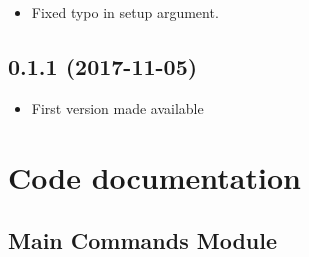 \documentclass[letterpaper,10pt,english]{sphinxmanual}
\begin{document}
\begin{itemize}
\item {} 
Fixed typo in setup  argument.

\end{itemize}


\section{0.1.1 (2017-11-05)}
\label{\detokenize{index:id7}}\begin{itemize}
\item {} 
First version made available

\end{itemize}


\chapter{Code documentation}
\label{\detokenize{index:code-documentation}}

\section{Main Commands Module}
\label{\detokenize{index:module-fsbackup.commands}}\label{\detokenize{index:main-commands-module}}\label{\detokenize{index:module-commands}}
\end{document}
